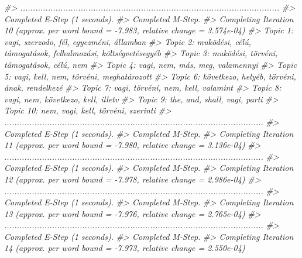 \documentclass[
]{book}
\newenvironment{Shaded}{\begin{snugshade}}{\end{snugshade}}
\newcommand{\CommentTok}[1]{\textcolor[rgb]{0.56,0.35,0.01}{\textit{#1}}}
\begin{document}
\begin{Shaded}
\begin{Highlighting}[]
\CommentTok{\#\textgreater{} .......................................................................................................}
\CommentTok{\#\textgreater{} Completed E{-}Step (1 seconds). }
\CommentTok{\#\textgreater{} Completed M{-}Step. }
\CommentTok{\#\textgreater{} Completing Iteration 10 (approx. per word bound = {-}7.983, relative change = 3.574e{-}04) }
\CommentTok{\#\textgreater{} Topic 1: vagi, szerzodo, fél, egyezméni, államban }
\CommentTok{\#\textgreater{}  Topic 2: muködési, célú, támogatások, felhalmozási, költségvetésegyéb }
\CommentTok{\#\textgreater{}  Topic 3: muködési, törvéni, támogatások, célú, nem }
\CommentTok{\#\textgreater{}  Topic 4: vagi, nem, más, meg, valamennyi }
\CommentTok{\#\textgreater{}  Topic 5: vagi, kell, nem, törvéni, meghatározott }
\CommentTok{\#\textgreater{}  Topic 6: következo, helyéb, törvéni, ának, rendelkezé }
\CommentTok{\#\textgreater{}  Topic 7: vagi, törvéni, nem, kell, valamint }
\CommentTok{\#\textgreater{}  Topic 8: vagi, nem, következo, kell, illetv }
\CommentTok{\#\textgreater{}  Topic 9: the, and, shall, vagi, parti }
\CommentTok{\#\textgreater{}  Topic 10: nem, vagi, kell, törvéni, szerinti }
\CommentTok{\#\textgreater{} .......................................................................................................}
\CommentTok{\#\textgreater{} Completed E{-}Step (1 seconds). }
\CommentTok{\#\textgreater{} Completed M{-}Step. }
\CommentTok{\#\textgreater{} Completing Iteration 11 (approx. per word bound = {-}7.980, relative change = 3.136e{-}04) }
\CommentTok{\#\textgreater{} .......................................................................................................}
\CommentTok{\#\textgreater{} Completed E{-}Step (1 seconds). }
\CommentTok{\#\textgreater{} Completed M{-}Step. }
\CommentTok{\#\textgreater{} Completing Iteration 12 (approx. per word bound = {-}7.978, relative change = 2.986e{-}04) }
\CommentTok{\#\textgreater{} .......................................................................................................}
\CommentTok{\#\textgreater{} Completed E{-}Step (1 seconds). }
\CommentTok{\#\textgreater{} Completed M{-}Step. }
\CommentTok{\#\textgreater{} Completing Iteration 13 (approx. per word bound = {-}7.976, relative change = 2.765e{-}04) }
\CommentTok{\#\textgreater{} .......................................................................................................}
\CommentTok{\#\textgreater{} Completed E{-}Step (1 seconds). }
\CommentTok{\#\textgreater{} Completed M{-}Step. }
\CommentTok{\#\textgreater{} Completing Iteration 14 (approx. per word bound = {-}7.973, relative change = 2.550e{-}04) }

\end{Highlighting}
\end{Shaded}
\end{document}
